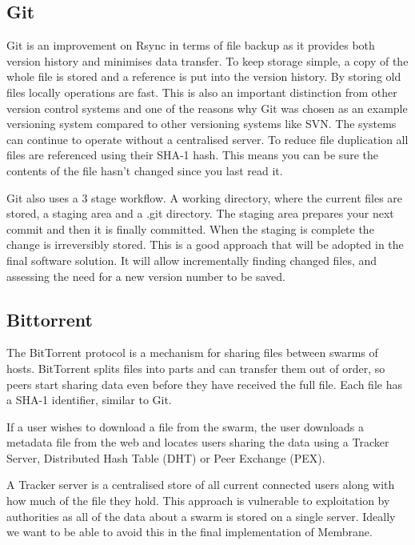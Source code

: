 \documentclass[11pt, a4paper, twocolumn, twoside]{report}
\begin{document}
\subsection{Git}

Git is an improvement on Rsync in terms of file backup as it provides both version history and minimises data transfer. To keep storage simple, a copy of the whole file is stored and a reference is put into the version history. By storing old files locally operations are fast. This is also an important distinction from other version control systems and one of the reasons why Git was chosen as an example versioning system compared to other versioning systems like SVN. The systems can continue to operate without a centralised server. To reduce file duplication all files are referenced using their SHA-1 hash. This means you can be sure the contents of the file hasn’t changed since you last read it. \citep{torvalds2010git}

Git also uses a 3 stage workflow. A working directory, where the current files are stored, a staging area and a .git directory. The staging area prepares your next commit and then it is finally committed. When the staging is complete the change is irreversibly stored. This is a good approach that will be adopted in the final software solution. It will allow incrementally finding changed files, and assessing the need for a new version number to be saved.

\subsection{Bittorrent}

The BitTorrent protocol is a mechanism for sharing files between swarms of hosts. BitTorrent splits files into parts and can transfer them out of order, so peers start sharing data even before they have received the full file. Each file has a SHA-1 identifier, similar to Git. \citep{qiu2004modeling}

If a user wishes to download a file from the swarm, the user downloads a metadata file from the web and locates users sharing the data using a Tracker Server, Distributed Hash Table (DHT) or Peer Exchange (PEX). \citep{cohen2008bittorrent}

A Tracker server is a centralised store of all current connected users along with how much of the file they hold. This approach is vulnerable to exploitation by authorities as all of the data about a swarm is stored on a single server. Ideally we want to be able to avoid this in the final implementation of Membrane.
\end{document}
